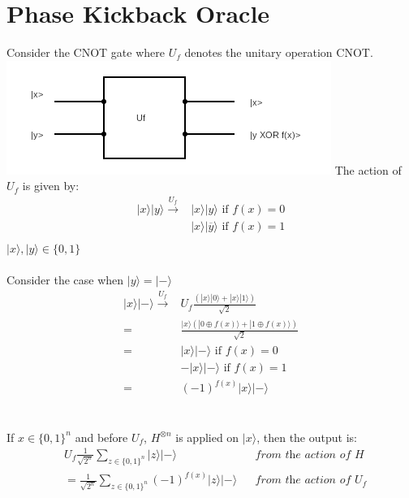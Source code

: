 \documentclass{article}
\begin{document}
\section{Phase Kickback Oracle}
Consider the CNOT gate where $U_f$ denotes the unitary operation CNOT.\\
\includegraphics{CNOT-1.png}
The action of $U_f$ is given by:
\begin{align*}
	|x\rangle|y\rangle \xrightarrow{U_f} & |x\rangle|y\rangle \text{ if }f(x)=0            \\
	                                     & |x\rangle|\overline{y}\rangle \text{ if }f(x)=1 \\
\end{align*}
$|x\rangle,|y\rangle \in \{0,1\}$
\\
\\
Consider the case when $|y\rangle=|-\rangle$
\begin{align*}
	|x\rangle|-\rangle \xrightarrow{U_f} & U_f\frac{(|x\rangle|0\rangle+|x\rangle|1\rangle)}{\sqrt{2}}              \\
	=                                    & \frac{|x\rangle(|0 \oplus f(x)\rangle +|1 \oplus f(x)\rangle)}{\sqrt{2}} \\
	=                                    & |x\rangle|-\rangle \text{ if } f(x)=0                                    \\
	                                     & -|x\rangle|-\rangle \text{ if } f(x)=1                                   \\
	=                                    & (-1)^{f(x)}|x\rangle|-\rangle
\end{align*}
\\
\\
If $x \in \{0, 1\}^n$ and before $U_f$, $H^{\otimes n}$ is applied on $|x\rangle$, then the output is:
\begin{align*}
	 & U_f \frac{1}{\sqrt{2^n}}\sum_{z \in \{0,1\}^n} |z\rangle|-\rangle           &  & \textit{from the action of H}     \\
	 & =\frac{1}{\sqrt{2^n}}\sum_{z \in \{0,1\}^n} (-1)^{f(x)} |z\rangle |-\rangle &  & \textit{from the action of $U_f$}
\end{align*}
\end{document}
